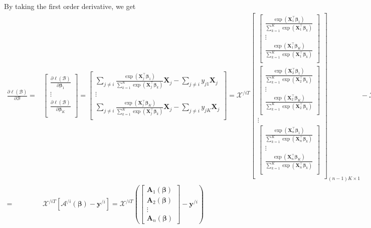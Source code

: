 \documentclass[11pt]{article}
\newcommand{\by}{\bm{y}}
\newcommand{\bX}{\bm{X}}
\newcommand{\bbeta}{\bm{\beta}}
\begin{document}
By taking the first order derivative, we get
$$\begin{aligned}
\frac{\partial \ell(\bm{\mathcal{B}})}{\partial\bm{\mathcal{B}}}=&
\begin{bmatrix}
\frac{\partial \ell(\bm{\mathcal{B}})}{\partial\bbeta_{1}} \\
\vdots \\
\frac{\partial \ell(\bm{\mathcal{B}})}{\partial\bbeta_{K}} \\
\end{bmatrix}=
\begin{bmatrix}
\sum_{j\neq i}\frac{\exp\left(\bX_j^\top\bbeta_1\right)}{\sum_{k=1}^K\exp\left(\bX_j^\top\bbeta_k\right)}\bX_j-
\sum_{j\neq i}y_{j1}\bX_j \\
\vdots \\
\sum_{j\neq i}\frac{\exp\left(\bX_j^\top\bbeta_K\right)}{\sum_{k=1}^K\exp\left(\bX_j^\top\bbeta_k\right)}\bX_j-
\sum_{j\neq i}y_{jK}\bX_j \\
\end{bmatrix} 
=\bm{\mathcal{X}}^{/iT}\begin{bmatrix}
\begin{bmatrix}\frac{\exp\left(\bX_1^\top\bbeta_1\right)}{\sum_{k=1}^K\exp\left(\bX_1^\top\bbeta_k\right)} \\
\vdots \\
\frac{\exp\left(\bX_1^\top\bbeta_K\right)}{\sum_{k=1}^K\exp\left(\bX_1^\top\bbeta_k\right)} \\
\end{bmatrix} \\
\begin{bmatrix}
\frac{\exp\left(\bX_2^\top\bbeta_1\right)}{\sum_{k=1}^K\exp\left(\bX_2^\top\bbeta_k\right)} \\
\vdots \\
\frac{\exp\left(\bX_2^\top\bbeta_K\right)}{\sum_{k=1}^K\exp\left(\bX_2^\top\bbeta_k\right)} \\
\end{bmatrix} \\
\vdots \\
\begin{bmatrix}
\frac{\exp\left(\bX_n^\top\bbeta_1\right)}{\sum_{k=1}^K\exp\left(\bX_n^\top\bbeta_k\right)} \\
\vdots \\
\frac{\exp\left(\bX_n^\top\bbeta_K\right)}{\sum_{k=1}^K\exp\left(\bX_n^\top\bbeta_k\right)} \\
\end{bmatrix} \\
\end{bmatrix}_{(n-1)K\times1}-\bm{\mathcal{X}}^{/iT}\by^{/i} \\
=&\bm{\mathcal{X}}^{/iT}\left[\bm{\mathcal{A}}^{/i}(\bbeta)-\by^{/i}\right]=\bm{\mathcal{X}}^{/iT}\left(
\begin{bmatrix}
\bm{A}_1(\bbeta) \\
\bm{A}_2(\bbeta) \\
\vdots \\
\bm{A}_n(\bbeta)
\end{bmatrix}-\by^{/i}\right)
\end{aligned}$$
\\
\end{document}
